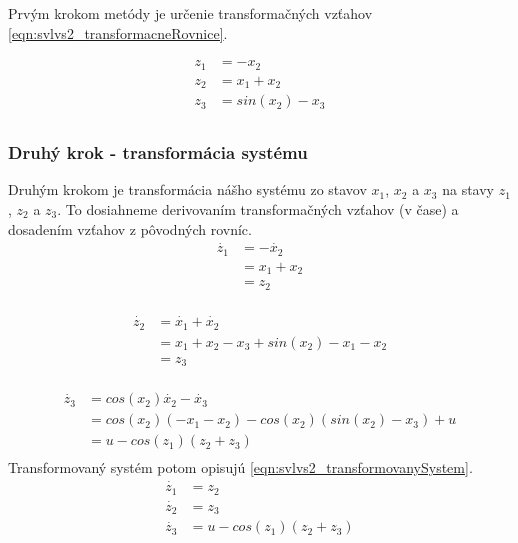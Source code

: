 \documentclass[../main.tex]{subfiles}
\begin{document}
Prvým krokom metódy je určenie transformačných vzťahov \cref{eqn:svlvs2_transformacneRovnice}.

	\begin{equation}
		\begin{aligned}
		z_1 &= -x_2 													\\
		z_2 &= x_1 + x_2												\\
		z_3 &= sin(x_2) - x_3 											\\
		\end{aligned}
		\label{eqn:svlvs2_transformacneRovnice}
	\end{equation}

    \subsubsection{Druhý krok - transformácia systému}
Druhým krokom je transformácia nášho systému zo stavov $x_1$, $x_2$ a $x_3$ na stavy $z_1$, $z_2$ a $z_3$. To dosiahneme derivovaním transformačných vzťahov (v čase) a dosadením vzťahov z pôvodných rovníc.
	\begin{equation}
        \begin{aligned}
        \dot{z_1} &= -\dot{x_2} \\
                  &= x_1 + x_2 \\
                  &=  z_2 \\
        \end{aligned}
	\end{equation}

	\begin{equation}
        \begin{aligned}
            \dot{z_2} &= \dot{x_1} + \dot{x_2}  \\
                      & = x_1 + x_2 - x_3 + sin(x_2) - x_1 - x_2  \\
                      &= z_3 	\\
        \end{aligned}
	\end{equation}

	\begin{equation}
        \begin{aligned}
            \dot{z_3} &= cos(x_2)\dot{x_2} - \dot{x_3} \\
                      &= cos(x_2)(-x_1 -x_2) -cos(x_2)(sin(x_2) - x_3) + u \\
                      &= u - cos(z_1)(z_2+z_3) 	\\
        \end{aligned}
	\end{equation}
	Transformovaný systém potom opisujú  \cref{eqn:svlvs2_transformovanySystem}.
	\begin{equation}
		\begin{aligned}
		\dot{z_1} &=  z_2												\\
		\dot{z_2} &=  z_3												\\
		\dot{z_3} &=  u - cos(z_1)(z_2+z_3)									\\
		\end{aligned}
		\label{eqn:svlvs2_transformovanySystem}
	\end{equation}
\end{document}
